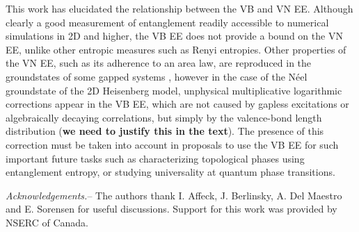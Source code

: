 \documentclass[prl,aps,twocolumn,floatfix,amsmath,amssymb,superscriptaddress,tightenlines]{revtex4}
\begin{document}
This work has elucidated the relationship between the VB and VN EE.  Although clearly a good measurement of entanglement readily accessible to numerical simulations in 2D and higher, the VB EE does not provide a bound on the VN EE, unlike other entropic measures such as Renyi entropies.  Other properties of the VN EE, such as its adherence to an area law, are reproduced in the groundstates of some gapped systems \cite{Alet,Chh}, however in the case of the N\'eel groundstate of the 2D Heisenberg model, unphysical multiplicative logarithmic corrections appear in the VB EE, which are not caused by gapless excitations or algebraically decaying correlations, but simply by the valence-bond length distribution ({\bf we need to justify this in the text}).  The presence of this correction must be taken into account in proposals to use the VB EE for such important future tasks such as characterizing topological phases using entanglement entropy, or studying universality at quantum phase transitions.

{\it Acknowledgements.}-- The authors thank I. Affeck, J. Berlinsky, A. Del Maestro and E. Sorensen for useful discussions.  Support for this work was provided by NSERC of Canada.



\end{document}
